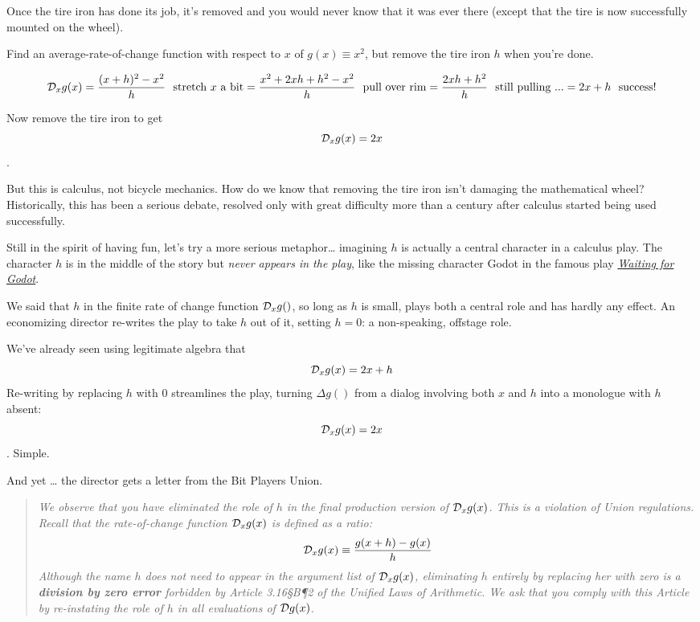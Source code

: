 \documentclass[
]{book}
\begin{document}
Once the tire iron has done its job, it's removed and you would never know that it was ever there (except that the tire is now successfully mounted on the wheel).

Find an average-rate-of-change function with respect to \(x\) of \(g(x) \equiv x^2\), but remove the tire iron \(h\) when you're done.

\[{\cal D}_x g(x)
= \frac{(x + h)^2 - x^2}{h}\ \ \mbox{stretch $x$ a bit}\\
= \frac{x^2 + 2 x h + h^2 - x^2}{h}\ \ \mbox{pull over rim}\\
= \frac{2 x h + h^2}{h} \ \ \mbox{still pulling ...}\\
= 2 x + h \ \ \mbox{success!}\]

Now remove the tire iron to get \[{\cal D}_x g(x) = 2x\].

But this is calculus, not bicycle mechanics. How do we know that removing the tire iron isn't damaging the mathematical wheel? Historically, this has been a serious debate, resolved only with great difficulty more than a century after calculus started being used successfully.

Still in the spirit of having fun, let's try a more serious metaphor\ldots{} imagining \(h\) is actually a central character in a calculus play. The character \(h\) is in the middle of the story but \emph{never appears in the play}, like the missing character Godot in the famous play \emph{\href{https://en.wikipedia.org/wiki/Waiting_for_Godot\#Godot}{Waiting for Godot}}.

We said that \(h\) in the finite rate of change function \({\cal D}_x g()\), so long as \(h\) is small, plays both a central role and has hardly any effect. An economizing director re-writes the play to take \(h\) out of it, setting \(h=0\): a non-speaking, offstage role.

We've already seen using legitimate algebra that \[{\cal D}_x g(x) = 2 x + h\] Re-writing by replacing \(h\) with 0 streamlines the play, turning \(\Delta g()\) from a dialog involving both \(x\) and \(h\) into a monologue with \(h\) absent: \[{\cal D}_x g(x) = 2 x\]. Simple.

And yet \ldots{} the director gets a letter from the Bit Players Union.

\begin{quote}
\emph{We observe that you have eliminated the role of \(h\) in the final production version of \({\cal D}_x g(x)\). This is a violation of Union regulations. Recall that the rate-of-change function \({\cal D}_x g(x)\) is defined as a ratio: \[{\cal D}_x g(x) \equiv \frac{g(x+h) - g(x)}{h}\] Although the name \(h\) does not need to appear in the argument list of \({\cal D}_x g(x)\), eliminating \(h\) entirely by replacing her with zero is a \textbf{division by zero error} forbidden by Article 3.16§B¶2 of the Unified Laws of Arithmetic. We ask that you comply with this Article by re-instating the role of \(h\) in all evaluations of \({\cal D} g(x)\).}
\end{quote}
\end{document}
